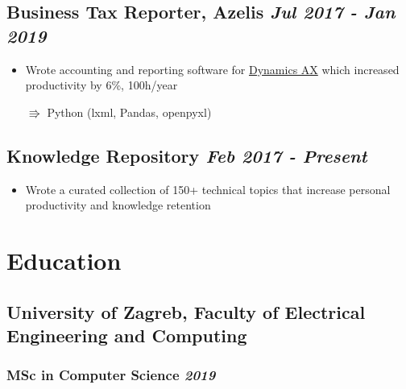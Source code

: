 \documentclass[a4paper]{article}
\newcommand{\bolditalicpair}
[2]
{\textbf{#1} \texorpdfstring{\hfill}{} \textit{#2}}
\begin{document}
\subsection{\bolditalicpair{Business Tax Reporter, Azelis}{Jul 2017 - Jan 2019}}

\begin{itemize}
  \item Wrote accounting and reporting software for \href{https://dynamics.microsoft.com/en-us/ax/}{Dynamics AX} which increased productivity by 6\%, 100h/year
  \item[$\Rrightarrow$] Python (lxml, Pandas, openpyxl)
\end{itemize}

\subsection{\bolditalicpair{Knowledge Repository}{Feb 2017 - Present}}

\begin{itemize}
  \item Wrote a curated collection of 150+ technical topics that increase personal productivity and knowledge retention
\end{itemize}





\section{Education}
\subsection{\bolditalicpair{University of Zagreb, Faculty of Electrical Engineering and Computing}{}}

\subsubsection{\bolditalicpair{MSc in Computer Science}{2019}}
\end{document}

